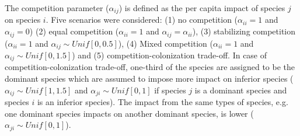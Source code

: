 The competition parameter ($\alpha_{ij}$) is defined as the per capita impact of species $j$ on species $i$. Five scenarios were considered: (1) no competition ($\alpha_{ii}=1$ and $\alpha_{ij}=0$) (2) equal competition ($\alpha_{ii}=1$ and $\alpha_{ij}=\alpha_{ii}$), (3) stabilizing competition ($\alpha_{ii}=1$ and $\alpha_{ij}\sim Unif[0,0.5]$), (4) Mixed competition ($\alpha_{ii}=1$ and $\alpha_{ij}\sim Unif[0,1.5]$) and (5) competition-colonization trade-off. In case of competition-colonization trade-off, one-third of the species are assigned to be the dominant species which are assumed to impose more impact on inferior species ($\alpha_{ij}\sim Unif[1,1.5]$ and $\alpha_{ji}\sim Unif[0,1]$ if species $j$ is a dominant species and species $i$ is an inferior species). The impact from the same types of species, e.g. one dominant species impacts on another dominant species, is lower ($\alpha_{ji}\sim Unif[0,1]$). 

